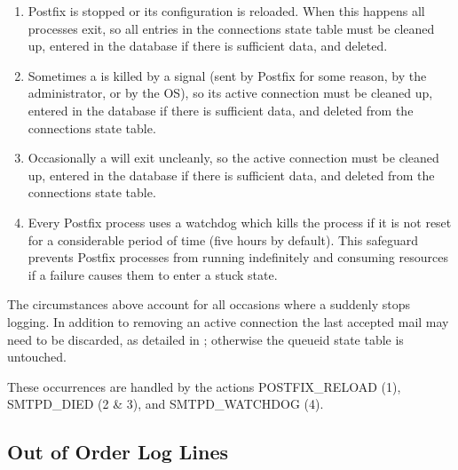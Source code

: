 \begin{enumerate}

    \item Postfix is stopped or its configuration is reloaded.  When this
        happens all  processes exit, so all entries in the
        connections state table must be cleaned up, entered in the database
        if there is sufficient data, and deleted.

    \item Sometimes a  is killed by a signal (sent by Postfix
        for some reason, by the administrator, or by the OS), so its active
        connection must be cleaned up, entered in the database if there is
        sufficient data, and deleted from the connections state table.

    \item Occasionally a  will exit uncleanly, so the active
        connection must be cleaned up, entered in the database if there is
        sufficient data, and deleted from the connections state table.

    \item Every Postfix process uses a watchdog which kills the process if
        it is not reset for a considerable period of time (five hours by
        default).  This safeguard prevents Postfix processes from running
        indefinitely and consuming resources if a failure causes them to
        enter a stuck state.

\end{enumerate}

The circumstances above account for all occasions where a 
suddenly stops logging.  In addition to removing an active connection the
last accepted mail may need to be discarded, as detailed in
; otherwise the queueid state table
is untouched.

These occurrences are handled by the actions POSTFIX\_RELOAD (1),
SMTPD\_DIED (2 \& 3), and SMTPD\_WATCHDOG (4).

\newpage{} %

\subsection{Out of Order Log Lines}

\label{out of order log lines}

